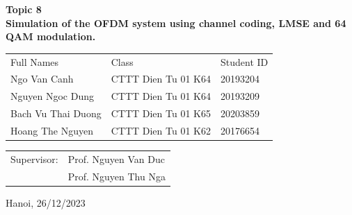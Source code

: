 \begin{center}
    \textbf{\fontsize{21pt}{0pt}\selectfont Topic 8 \\}
    \textbf{\fontsize{21pt}{0pt}\selectfont Simulation of the OFDM system using channel coding, LMSE and 64 QAM modulation. }
\vspace{7pt}
\begin{table}[H]
    \centering
    \begin{tabular}{l l l}
        Full Names          & Class                 & Student ID \\
        Ngo Van Canh        & CTTT Dien Tu 01 K64   & 20193204 \\
        Nguyen Ngoc Dung    & CTTT Dien Tu 01 K64   & 20193209 \\
        Bach Vu Thai Duong  & CTTT Dien Tu 01 K65   & 20203859 \\
        Hoang The Nguyen    & CTTT Dien Tu 01 K62   & 20176654 \\
    \end{tabular}
\end{table}
\vspace{1.5cm}
\begin{table}[H]
    \centering
    \begin{tabular}{l l}
        \fontsize{14pt}{0pt}\selectfont Supervisor: & Prof. Nguyen Van Duc \\
        {} & Prof. Nguyen Thu Nga \hspace{5pt} \\
    \end{tabular}
\end{table}
\vspace{1.5cm}
\fontsize{14pt}{0pt}\selectfont Hanoi, 26/12/2023
\end{center}

